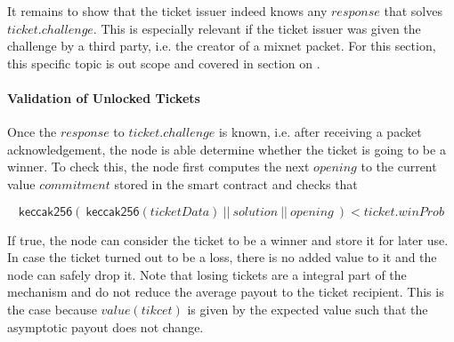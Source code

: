 It remains to show that the ticket issuer indeed knows any $response$ that solves $ticket.challenge$. This is especially relevant if the ticket issuer was given the challenge by a third party, i.e. the creator of a mixnet packet. For this section, this specific topic is out scope and covered in section on .

\paragraph{Validation of Unlocked Tickets}
\label{sec:tickets:validation:unlocked}

Once the $response$ to $ticket.challenge$ is known, i.e. after receiving a packet acknowledgement, the node is able determine whether the ticket is going to be a winner. To check this, the node first computes the next $opening$ to the current value $commitment$ stored in the smart contract and checks that

$$ \mathsf{keccak256} ( \ \mathsf{keccak256}(ticketData) \ || \ solution \ || \ opening \ ) < ticket.winProb $$

If true, the node can consider the ticket to be a winner and store it for later use. In case the ticket turned out to be a loss, there is no added value to it and the node can safely drop it. Note that losing tickets are a integral part of the mechanism and do not reduce the average payout to the ticket recipient. This is the case because $value(tikcet)$ is given by the expected value such that the asymptotic payout does not change.